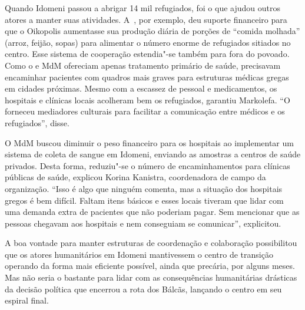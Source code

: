 Quando Idomeni passou a abrigar 14 mil refugiados, foi o  que ajudou
outros atores a manter suas atividades. A~, por exemplo, deu
suporte financeiro para que o Oikopolis aumentasse sua produção diária
de porções de ``comida molhada'' (arroz, feijão, sopas) para
alimentar o número enorme de refugiados sitiados no centro. Esse
sistema de cooperação estendia"-se também para fora do povoado. Como o
 e MdM ofereciam apenas tratamento primário de saúde, precisavam
encaminhar pacientes com quadros mais graves para estruturas médicas
gregas em cidades próximas. Mesmo com a escassez de pessoal e
medicamentos, os hospitais e clínicas locais
acolheram bem os refugiados, garantiu Markolefa.
``O  forneceu mediadores culturais para
facilitar a comunicação entre médicos e os refugiados'', disse.

O MdM buscou diminuir o peso financeiro para os hospitais ao implementar
um sistema de coleta de sangue em Idomeni, enviando as amostras a
centros de saúde privados. Desta forma, reduziu"-se o número de
encaminhamentos para clínicas públicas de saúde, explicou Korina
Kanistra, coordenadora de campo da organização. ``Isso é algo que
ninguém comenta, mas a situação dos hospitais gregos é bem difícil.
Faltam itens básicos e esses locais tiveram que lidar com uma demanda
extra de pacientes que não poderiam pagar. Sem mencionar que as pessoas
chegavam aos hospitais e nem conseguiam se comunicar'', explicitou.

A boa vontade para manter estruturas de coordenação e colaboração
possibilitou que os atores humanitários em Idomeni mantivessem o centro
de transição operando da forma mais eficiente  possível, ainda que
precária, por alguns meses. Mas não seria o bastante para lidar com as
consequências humanitárias drásticas da decisão política que encerrou a 
rota dos Bálcãs, lançando o centro em seu espiral final.


